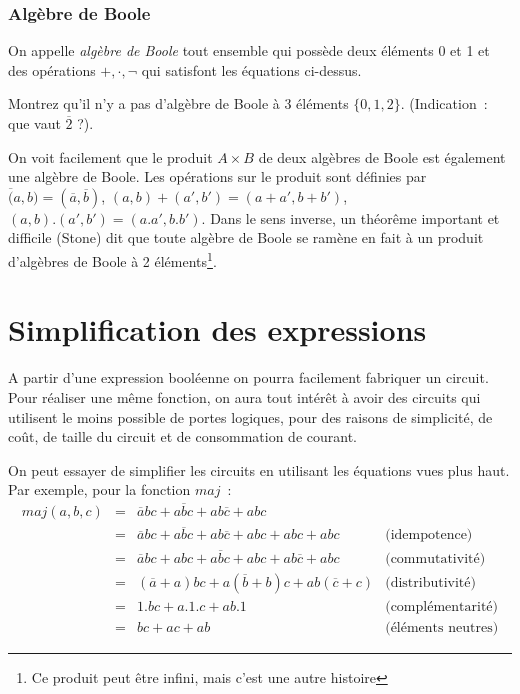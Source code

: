 \subsubsection{Alg\`ebre de Boole}


On appelle {\em alg\`ebre de Boole} tout ensemble qui poss\`ede deux \'el\'ements
0 et 1 et des op\'erations $+,\cdot,\neg$ qui satisfont les \'equations ci-dessus.

\begin{exercice}{} Montrez qu'il n'y a pas d'alg\`ebre de Boole \`a 
3 \'el\'ements $\{0,1,2\}$. (Indication~: que vaut $\overline{2}$ ?).
\end{exercice}

On voit facilement que le produit $A \times B$ de deux alg\`ebres de
Boole est \'egalement une alg\`ebre de Boole. Les op\'erations sur le
produit sont d\'efinies par
$\overline(a,b)=(\overline{a},\overline{b})$, $(a,b) + (a',b') =
(a+a',b+b')$, $(a,b).(a',b') = (a.a',b.b')$.  Dans le sens inverse, un
th\'eor\^eme important et difficile (Stone) dit que toute alg\`ebre de
Boole se ram\`ene en fait \`a un produit d'alg\`ebres de Boole \`a 2
\'el\'ements\footnote{Ce produit peut \^etre infini, 
mais c'est une autre histoire}.


\section{Simplification des expressions}

A partir d'une expression  bool\'eenne on pourra facilement fabriquer un
circuit. Pour r\'ealiser une m\^eme fonction, on aura tout int\'er\^et \`a 
avoir des circuits qui utilisent le moins possible
de portes logiques, pour des raisons de simplicit\'e, de co\^ut, de taille du 
circuit et de consommation de courant.


On peut essayer de simplifier les circuits en  utilisant les \'equations vues
plus haut. Par exemple, pour la fonction $maj$~:
$$ \begin{array}{rcll}
	maj(a,b,c)&=& \overline{a}bc + a\overline{b}c + ab\overline{c} + abc \\
&=&  \overline{a}bc + a\overline{b}c + ab\overline{c} + abc + abc + abc &
\mbox{(idempotence)} \\
&=&  \overline{a}bc + abc + a\overline{b}c +abc + ab\overline{c} + abc &
\mbox{(commutativit\'e)} \\
&=&  (\overline{a}+a)bc  + a(\overline{b}+b)c + ab(\overline{c}+c) &
\mbox{(distributivit\'e)} \\
&=&  1.bc  + a.1.c + ab.1 & \mbox{(compl\'ementarit\'e)} \\
&=&  bc  + ac + ab & \mbox{(\'el\'ements neutres)} 
\end{array} $$

